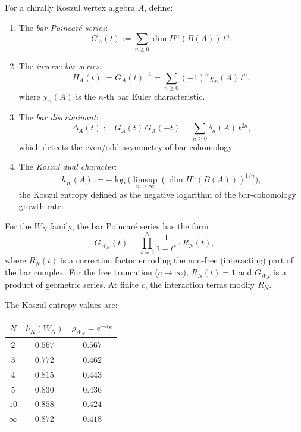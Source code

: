 \begin{definition}
For a chirally Koszul vertex algebra $A$, define:
\begin{enumerate}[leftmargin=2.4em]
\item The \emph{bar Poincar\'e series}:
\begin{equation}%
G_A(t) := \sum_{n \ge 0} \dim H^n(B(A))\, t^n.
\end{equation}

\item The \emph{inverse bar series}:
\begin{equation}%
H_A(t) := G_A(t)^{-1} = \sum_{n \ge 0} (-1)^n \chi_n(A)\, t^n,
\end{equation}
where $\chi_n(A)$ is the $n$-th bar Euler characteristic.

\item The \emph{bar discriminant}:
\begin{equation}%
\Delta_A(t) := G_A(t)\,G_A(-t) = \sum_{n \ge 0} \delta_n(A)\, t^{2n},
\end{equation}
which detects the even/odd asymmetry of bar cohomology.

\item The \emph{Koszul dual character}:
\begin{equation}%
h_K(A) := -\log\bigl(\limsup_{n\to\infty}(\dim H^n(B(A)))^{1/n}\bigr),
\end{equation}
the Koszul entropy defined as the negative logarithm of the
bar-cohomology growth rate.
\end{enumerate}
\end{definition}

\begin{computation}
For the $W_N$ family, the bar Poincar\'e series has the form
\[
G_{W_N}(t) = \prod_{s=2}^{N} \frac{1}{1 - t^s}
\cdot R_N(t),
\]
where $R_N(t)$ is a correction factor encoding the non-free
(interacting) part of the bar complex. For the free truncation
($c \to \infty$), $R_N(t) = 1$ and $G_{W_N}$ is a product of
geometric series. At finite $c$, the interaction terms modify $R_N$.

The Koszul entropy values are:

\smallskip
\begin{center}
\begin{tabular}{c c c}
$N$ & $h_K(W_N)$ & $\rho_{W_N} = e^{-h_K}$ \\
\hline
$2$ & $0.567$ & $0.567$ \\
$3$ & $0.772$ & $0.462$ \\
$4$ & $0.815$ & $0.443$ \\
$5$ & $0.830$ & $0.436$ \\
$10$ & $0.858$ & $0.424$ \\
$\infty$ & $0.872$ & $0.418$
\end{tabular}
\end{center}
\end{computation}

